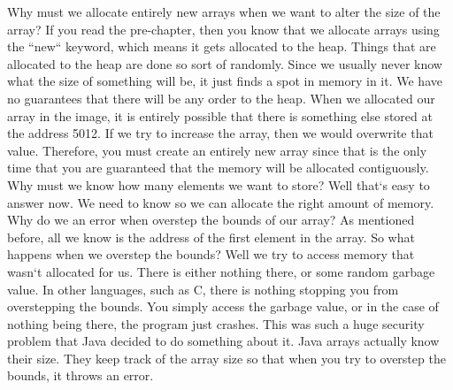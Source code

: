 \documentclass[11]{article}
\begin{document}
Why must we allocate entirely new arrays when we want to alter the size of the array? If you read the pre-chapter, then you know that we allocate arrays using the ``new`` keyword, which means it gets allocated to the heap. Things that are allocated to the heap are done so sort of randomly. Since we usually never know what the size of something will be, it just finds a spot in memory in it. We have no guarantees that there will be any order to the heap. When we allocated our array in the image, it is entirely possible that there is something else stored at the address 5012. If we try to increase the array, then we would overwrite that value. Therefore, you must create an entirely new array since that is the only time that you are guaranteed that the memory will be allocated contiguously.\\

Why must we know how many elements we want to store? Well that`s easy to answer now. We need to know so we can allocate the right amount of memory.\\

Why do we an error when overstep the bounds of our array? As mentioned before, all we know is the address of the first element in the array. So what happens when we overstep the bounds? Well we try to access memory that wasn`t allocated for us. There is either nothing there, or some random garbage value. In other languages, such as C, there is nothing stopping you from overstepping the bounds. You simply access the garbage value, or in the case of nothing being there, the program just crashes. This was such a huge security problem that Java decided to do something about it. Java arrays actually know their size. They keep track of the array size so that when you try to overstep the bounds, it throws an error.
\end{document}

